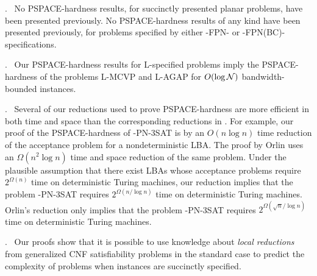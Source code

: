 \smallskip
{}.~
No {\sf PSPACE-}hardness results, for succinctly presented 
planar problems, have been presented previously. No {\sf PSPACE-}hardness 
results of any kind have been presented previously, for problems specified
by either {-FPN-} or {-FPN(BC)-}specifications.

\smallskip
{}.~
Our {\sf PSPACE-}hardness results for {\sf L-}specified
problems imply the {\sf PSPACE-}hardness of the problems 
{\sf L-MCVP} and {\sf L-AGAP} for $O(\log {\cal N})$ 
bandwidth-bounded instances.

\smallskip
{}.~
Several of our  reductions  used to prove {\sf PSPACE-}hardness
are more  efficient in both   time  and space than  the  corresponding
reductions in \cite{Or82a,LW92}. For example,   our proof of the  {\sf
PSPACE-}hardness  of  {-PN-3SAT}  is   by an  $O(n\log n)$  time
reduction of the acceptance problem  for a nondeterministic {\sf LBA}.
The proof by Orlin \cite{Or82a} uses  an $\Omega(n^2 \log n)$  time  and
space reduction  of the same  problem. Under the  plausible assumption
that  there exist   {\sf  LBA}s   whose acceptance  problems   require
$2^{\Omega(n)}$ time  on deterministic Turing machines,  our reduction
implies    that     the    problem     {-PN-3SAT}     requires
$2^{\Omega(n/\log{n})}$   time  on   deterministic    Turing
machines. Orlin's reduction only  implies that the problem {-PN-3SAT}
requires   $2^{\Omega(\sqrt{n}/{\log {n}})}$ time on deterministic
Turing machines.

\smallskip
{}.~
Our proofs show that it is possible to use knowledge 
about {\em local reductions} from generalized {\sf CNF} satisfiability problems
in the standard case to predict the complexity of problems when instances
are succinctly specified. 


